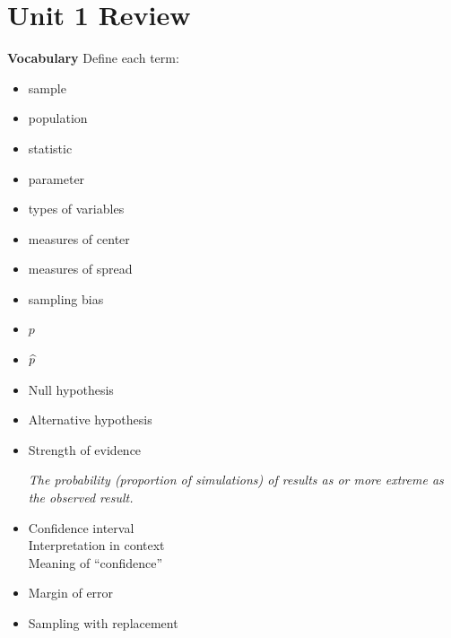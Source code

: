 
\def\theTopic{Unit 1 Review }
\def\dayNum{10}

\section{ Unit 1 Review }
 
  {\bf Vocabulary} Define each term:
\begin{itemize}
\item sample
\item population
\item statistic
\item parameter
\item types of variables
\item measures of center
\item measures of spread
\item sampling bias
\item $p$
\item $\widehat{p}$
 \item Null hypothesis 
 \item Alternative hypothesis
\item Strength of evidence 
\begin{key}
{\it
    The probability (proportion of simulations) of results as or
    more extreme as the observed result.}
\end{key}
\item Confidence interval\\
     Interpretation in context\\
     Meaning of ``confidence''
\item Margin of error
\item Sampling with replacement
\end{itemize}
\begin{students}
\newpage
\end{students}



